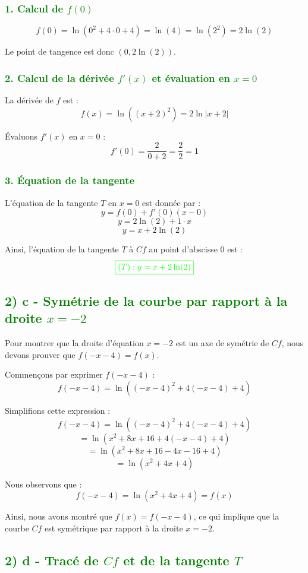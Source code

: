 \documentclass[12pt]{article}
\begin{document}
\subsubsection*{\textcolor{green}{1. Calcul de \( f(0) \)}}
\[
f(0) = \ln(0^2 + 4 \cdot 0 + 4) = \ln(4) = \ln(2^2) = 2 \ln(2)
\]

Le point de tangence est donc \((0, 2 \ln(2))\).

\subsubsection*{\textcolor{green}{2. Calcul de la dérivée \( f'(x) \) et évaluation en \( x = 0 \)}}
La dérivée de \( f \) est :
\[
f(x) = \ln((x + 2)^2) = 2 \ln|x + 2|
\]

Évaluons \( f'(x) \) en \( x = 0 \) :
\[
f'(0) = \frac{2}{0 + 2} = \frac{2}{2} = 1
\]

\subsubsection*{\textcolor{green}{3. Équation de la tangente}}
L'équation de la tangente \( T \) en \( x = 0 \) est donnée par :
\[
y = f(0) + f'(0)(x - 0)
\]
\[
y = 2 \ln(2) + 1 \cdot x
\]
\[
y = x + 2 \ln(2)
\]

Ainsi, l'équation de la tangente \( T \) à \( Cf \) au point d'abscisse \( 0 \) est :
\[\textcolor{green}{\boxed{
(T):y = x + 2 \ln(2)
}}\]

\subsection*{\textcolor{green}{2) c - Symétrie de la courbe par rapport à la droite \( x = -2 \)}}

Pour montrer que la droite d'équation \( x = -2 \) est un axe de symétrie de \( Cf \), nous devons prouver que \( f(-x-4) = f(x) \).

Commençons par exprimer \( f(-x-4) \) :
\[
f(-x-4) = \ln((-x-4)^2 + 4(-x-4) + 4)
\]

Simplifions cette expression :
\[
f(-x-4) = \ln((-x-4)^2 + 4(-x-4) + 4)
\]
\[
= \ln(x^2 + 8x + 16 + 4(-x-4) + 4)
\]
\[
= \ln(x^2 + 8x + 16 - 4x - 16 + 4)
\]
\[
= \ln(x^2 + 4x + 4)
\]

Nous observons que :
\[
f(-x-4) = \ln(x^2 + 4x + 4) = f(x)
\]

Ainsi, nous avons montré que \( f(x) = f(-x-4) \), ce qui implique que la courbe \( Cf \) est symétrique par rapport à la droite \( x = -2 \).
\subsection*{\textcolor{green}{2) d - Tracé de \( Cf \) et de la tangente \( T \)}}
\end{document}

